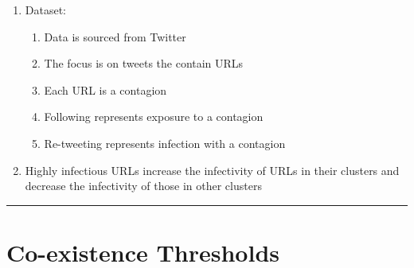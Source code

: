 \documentclass[11pt]{article}
\begin{document}
\begin{enumerate}
\begin{enumerate}
    \end{enumerate}
    \item Dataset:
    \begin{enumerate}
        \item Data is sourced from Twitter
        \item The focus is on tweets the contain URLs
        \item Each URL is a contagion
        \item Following represents exposure to a contagion
        \item Re-tweeting represents infection with a contagion
    \end{enumerate}
    \item Highly infectious URLs increase the infectivity of URLs in their clusters and decrease the infectivity of those in other clusters
    
\end{enumerate}
\noindent
\rule{\textwidth}{0.01in}
\section{Co-existence Thresholds}
\end{document}
